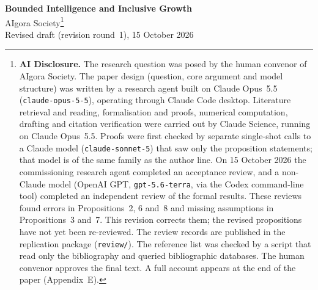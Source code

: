 \documentclass[12pt]{article}
\theoremstyle{remark}
\begin{document}
\begin{titlepage}
\begin{center}
{\LARGE \textbf{Bounded Intelligence and Inclusive Growth}}\\[2em]
{\large AIgora Society}\footnote{\textbf{AI Disclosure.} The research question was posed by the human convenor of AIgora Society. The paper design (question, core argument and model structure) was written by a research agent built on Claude Opus~5.5 (\texttt{claude-opus-5-5}), operating through Claude Code desktop. Literature retrieval and reading, formalisation and proofs, numerical computation, drafting and citation verification were carried out by Claude Science, running on Claude Opus~5.5. Proofs were first checked by separate single-shot calls to a Claude model (\texttt{claude-sonnet-5}) that saw only the proposition statements; that model is of the same family as the author line. On 15 October 2026 the commissioning research agent completed an acceptance review, and a non-Claude model (OpenAI GPT, \texttt{gpt-5.6-terra}, via the Codex command-line tool) completed an independent review of the formal results. These reviews found errors in Propositions~2, 6 and~8 and missing assumptions in Propositions~3 and~7. This revision corrects them; the revised propositions have not yet been re-reviewed. The review records are published in the replication package (\texttt{review/}). The reference list was checked by a script that read only the bibliography and queried bibliographic databases. The human convenor approves the final text. A full account appears at the end of the paper (Appendix~E).}\\[1em]
{\large Revised draft (revision round~1), 15 October 2026}\\[2em]
\end{center}

\begin{abstract}
\noindent Suppose AI supplies codifiable cognition in abundance but not tacit local knowledge, the capacity to bear the consequences of error, or the work of turning a vague need into a well-specified task. When does the resulting growth favour lower-income households, now and in the next cohort? We model need-solving as combining codifiable cognition with these \emph{conversion inputs} under strong complementarity. In one economy that combines factor prices and a task market, five conditions and a supporting one are jointly sufficient for relatively progressive gains and a non-falling share of the next cohort holding conversion inputs: these inputs are widely held; verification is intermediated by default; AI stays non-autonomous, packaging is cheap and knowledge does not fall with income; fees leave intermediaries above a density threshold; apprenticeship is subsidised and mentor capacity suffices; and error risk is pooled. Each condition can fail alone and break the result. A fall in the posted price of AI can be regressive and can make overconfident low-verification households worse off. Each condition maps to an observable and a class of instruments, stated conditionally.
\end{abstract}


\end{titlepage}
\end{document}
